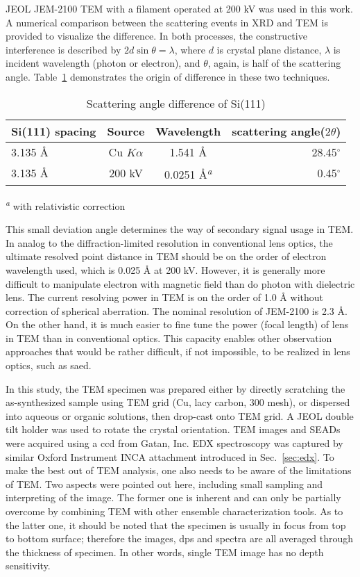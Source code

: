 JEOL JEM-2100 TEM with a  filament operated at 200 kV was used in this work. A numerical comparison between the scattering events in XRD and TEM is provided to visualize the difference. In both processes, the constructive interference is described by $2d\sin\theta = \lambda$, where $d$ is crystal plane distance, $\lambda$ is incident wavelength (photon or electron), and $\theta$, again, is half of the scattering angle. Table~\ref{tab:ch2tem} demonstrates the origin of difference in these two techniques.
\begin{table}[htb]
\centering
\caption{Scattering angle difference of Si(111)}\label{tab:ch2tem}
\begin{tabular}{lccr}
\toprule
Si(111) spacing & Source & Wavelength & scattering angle($2\theta$) \\
\midrule
3.135 \AA & Cu $K\alpha$ & 1.541 \AA & 28.45$^\circ$  \\
3.135 \AA & 200 kV & 0.0251 \si{\angstrom}\textsuperscript{\emph{a}}& 0.45$^\circ$  \\
\bottomrule
\end{tabular}


\textsuperscript{\emph{a}} with relativistic correction
\end{table}
This small deviation angle determines the way of secondary signal usage in TEM. In analog to the diffraction-limited resolution in conventional lens optics, the ultimate resolved point distance in TEM should be on the order of electron wavelength used, which is 0.025 \si{\angstrom} at 200 kV. However, it is generally more difficult to manipulate electron with magnetic field than do photon with dielectric lens. The current resolving power in TEM is on the order of 1.0 \si{\angstrom} without correction of spherical aberration. The nominal resolution of JEM-2100 is 2.3 \si{\angstrom}. On the other hand, it is much easier to fine tune the power (focal length) of lens in TEM than in conventional optics. This capacity enables other observation approaches that would be rather difficult, if not impossible, to be realized in lens optics, such as \gls{saed}. 

In this study, the TEM specimen was prepared either by directly scratching the as-synthesized sample using TEM grid (Cu, lacy carbon, 300 mesh), or dispersed into aqueous or organic solutions, then drop-cast onto TEM grid. A JEOL double tilt holder was used to rotate the crystal orientation. TEM images and SEADs were acquired using a \gls{ccd} from Gatan, Inc. EDX spectroscopy was captured by similar Oxford Instrument INCA attachment introduced in Sec.~\ref{sec:edx}. To make the best out of TEM analysis, one also needs to be aware of the limitations of TEM. Two aspects were pointed out here, including small sampling and interpreting of the image. The former one is inherent and can only be partially overcome by combining TEM with other ensemble characterization tools. As to the latter one, it should be noted that the specimen is usually in focus from top to bottom surface; therefore the images, \glspl{dp} and spectra are all averaged through the thickness of specimen. In other words, single TEM image has no depth sensitivity.\cite{Williams2009}  


